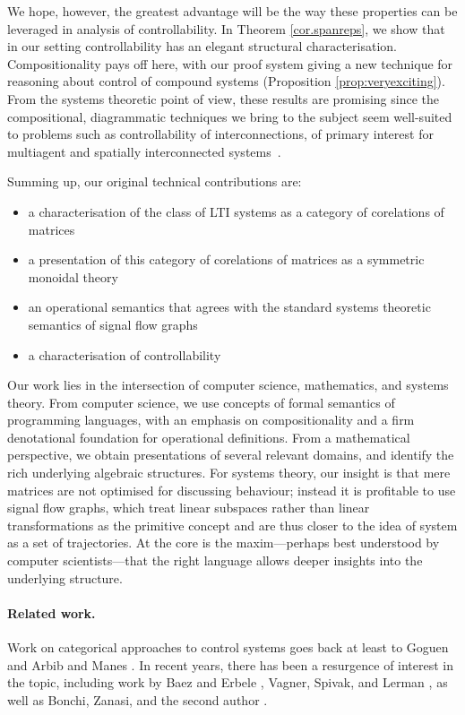 We hope, however, the greatest advantage will be the way these properties can be
leveraged in analysis of controllability. In Theorem \ref{cor.spanreps}, we
show that in our setting controllability has an elegant structural
characterisation.  Compositionality pays off here, with our proof system giving
a new technique for reasoning about control of compound systems (Proposition
\ref{prop:veryexciting}).  From the systems theoretic point of view, these
results are promising since the compositional, diagrammatic techniques we bring
to the subject seem well-suited to problems such as controllability of
interconnections, of primary interest for multiagent and spatially
interconnected systems~\cite{OFM}.

\smallskip
Summing up, our original technical contributions are:
\begin{itemize}
\item a characterisation of the class of LTI systems as a category of corelations of matrices
\item a presentation of this category of corelations of matrices as a symmetric
  monoidal theory
\item an operational semantics that agrees with the standard systems theoretic
semantics of signal flow graphs
\item a characterisation of controllability
\end{itemize}

\smallskip

Our work lies in the intersection of computer science, mathematics, and systems
theory.  From computer science, we use concepts  of formal semantics of
programming languages, with an emphasis on compositionality and a firm
denotational foundation for operational definitions.  From a mathematical
perspective, we obtain presentations of several relevant domains, and identify
the rich underlying algebraic structures.  For systems theory, our insight is
that mere matrices are not optimised for discussing behaviour; instead it is
profitable to use signal flow graphs, which treat linear subspaces rather than
linear transformations as the primitive concept and are thus closer to the idea
of system as a set of trajectories. At the core is the maxim---perhaps best
understood by computer scientists---that the right language allows deeper
insights into the underlying structure.

\paragraph{Related work.}
Work on categorical approaches to control systems goes back at least to Goguen
\cite{Go} and Arbib and Manes \cite{AM}. In recent years, there has been a
resurgence of interest in the topic, including work by Baez and Erbele
\cite{BE}, Vagner, Spivak, and Lerman \cite{VSL}, as well as Bonchi, Zanasi, and
the second author \cite{BSZ1,BSZ2,BSZ3,Za}. 

